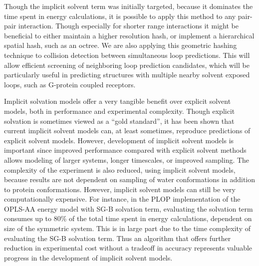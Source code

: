 Though the implicit solvent term was initially targeted, because it dominates the time spent in energy calculations, it is possible to apply this method to any pair-pair interaction.
Though especially for shorter range interactions it might be beneficial to either maintain a higher resolution hash, or implement a hierarchical spatial hash, such as an octree.
We are also applying this geometric hashing technique to collision detection between simultaneous loop predictions.
This will allow efficient screening of neighboring loop prediction candidates, which will be particularly useful in predicting structures with multiple nearby solvent exposed loops, such as G-protein coupled receptors.

Implicit solvation models offer a very tangible benefit over explicit solvent models, both in performance and experimental complexity.
Though explicit solvation is sometimes viewed as a ``gold standard'', it has been shown that current implicit solvent models can, at least sometimes, reproduce predictions of explicit solvent models.
However, development of implicit solvent models is important since improved performance compared with explicit solvent methods allows modeling of larger systems, longer timescales, or improved sampling.
The complexity of the experiment is also reduced, using implicit solvent models, because results are not dependent on sampling of water conformations in addition to protein conformations.
However, implicit solvent models can still be very computationally expensive.
For instance, in the PLOP implementation of the OPLS-AA energy model with SG-B solvation term, evaluating the solvation term consumes up to 80\% of the total time spent in energy calculations, dependent on size of the symmetric system.
This is in large part due to the time complexity of evaluating the SG-B solvation term.
Thus an algorithm that offers further reduction in experimental cost without a tradeoff in accuracy represents valuable progress in the development of implicit solvent models.



